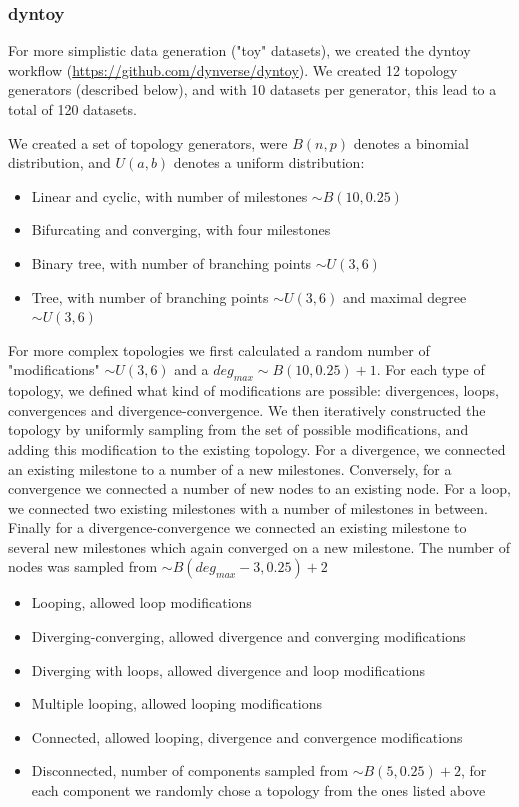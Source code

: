 \subsubsection{dyntoy}

For more simplistic data generation ("toy" datasets), we created the dyntoy workflow (\url{https://github.com/dynverse/dyntoy}). We created 12 topology generators (described below), and with 10 datasets per generator, this lead to a total of 120 datasets.

We created a set of topology generators, were $B(n, p)$ denotes a binomial distribution, and $U(a, b)$ denotes a uniform distribution:

\begin{itemize}
	\item Linear and cyclic, with number of milestones $\sim B(10, 0.25)$
	\item Bifurcating and converging, with four milestones
	\item Binary tree, with number of branching points $\sim U(3, 6)$
	\item Tree, with number of branching points $\sim U(3, 6)$ and maximal degree $\sim U(3, 6)$
\end{itemize} 

For more complex topologies we first calculated a random number of "modifications" $\sim U(3, 6)$ and a $\textit{deg}_{\textit{max}} \sim B(10, 0.25) + 1$. For each type of topology, we defined what kind of modifications are possible: divergences, loops, convergences and divergence-convergence. We then iteratively constructed the topology by uniformly sampling from the set of possible modifications, and adding this modification to the existing topology. For a divergence, we connected an existing milestone to a number of a new milestones. Conversely, for a convergence we connected a number of new nodes to an existing node. For a loop, we connected two existing milestones with a number of milestones in between. Finally for a divergence-convergence we connected an existing milestone to several new milestones which again converged on a new milestone. The number of nodes was sampled from $\sim B(\textit{deg}_{\textit{max}} - 3, 0.25) + 2$

\begin{itemize}
	\item Looping, allowed loop modifications
	\item Diverging-converging, allowed divergence and converging modifications
	\item Diverging with loops, allowed divergence and loop modifications
	\item Multiple looping, allowed looping modifications
	\item Connected, allowed looping, divergence and convergence modifications
	\item Disconnected, number of components sampled from $\sim B(5, 0.25) + 2$, for each component we randomly chose a topology from the ones listed above
\end{itemize}

